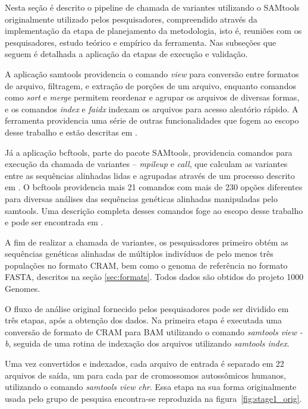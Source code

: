 \documentclass[cic,tc]{iiufrgs}
\begin{document}
Nesta seção é descrito o pipeline de chamada de variantes utilizando o SAMtools
originalmente utilizado pelos pesquisadores, compreendido através da
implementação da etapa de planejamento da metodologia, isto é, reuniões com os
pesquisadores, estudo teórico e empírico da ferramenta. Nas subseções que
seguem é detalhada a aplicação da etapas de execução e validação.

A aplicação samtools providencia o comando \textit{view} para conversão entre
formatos de arquivo, filtragem, e extração de porções de um arquivo, enquanto
comandos como \textit{sort} e \textit{merge} permitem reordenar e agrupar os
arquivos de diversas formas, e os comandos \textit{index} e \textit{faidx}
indexam os arquivos para acesso aleatório rápido. A ferramenta providencia uma
série de outras funcionalidades que fogem ao escopo desse trabalho e estão
descritas em \cite{danecek2021twelve}.

Já a aplicação bcftools, parte do pacote SAMtools, providencia comandos para
execução da chamada de variantes -- \textit{mpileup} e \textit{call}, que
calculam as variantes entre as sequências alinhadas lidas e agrupadas através
de um processo descrito em \cite{li2011improving}. O bcftools providencia mais
21 comandos com mais de 230 opções diferentes para diversas análises das
sequências genéticas alinhadas manipuladas pelo samtools. Uma descrição
completa desses comandos foge ao escopo desse trabalho e pode ser encontrada em
\cite{danecek2021twelve}.

A fim de realizar a chamada de variantes, os pesquisadores primeiro obtém as
sequências genéticas alinhadas de múltiplos indivíduos de pelo menos três
populações no formato CRAM, bem como o genoma de referência no formato FASTA,
descritos na seção \ref{sec:formats}. Todos dados são obtidos do projeto 1000
Genomes.

O fluxo de análise original fornecido pelos pesquisadores pode ser dividido em
três etapas, após a obtenção dos dados. Na primeira etapa é executada uma
conversão de formato de CRAM para BAM utilizando o comando \textit{samtools
view -b}, seguida de uma rotina de indexação dos arquivos utilizando
\textit{samtools index}.

Uma vez convertidos e indexados, cada arquivo de entrada é separado em 22
arquivos de saída, um para cada par de cromossomos autossômicos humanos,
utilizando o comando \textit{samtools view chr}. Essa etapa na sua forma
originalmente usada pelo grupo de pesquisa encontra-se reproduzida na
figura~\ref{fig:stage1_orig}.
\end{document}
